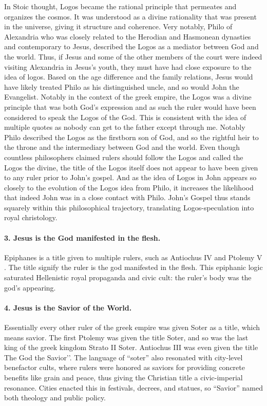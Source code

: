 In Stoic thought, Logos became the rational principle that permeates and organizes the cosmos.
It was understood as a divine rationality that was present in the universe, giving it structure and coherence.
Very notably, Philo of Alexandria who was closely related to the Herodian and Hasmonean dynasties and contemporary to Jesus, described the Logos as a mediator between God and the world.
Thus, if Jesus and some of the other members of the court were indeed visiting Alexandria in Jesus’s youth, they must have had close exposure to the idea of logos.
Based on the age difference and the family relations, Jesus would have likely treated Philo as his distinguished uncle, and so would John the Evangelist.
Notably in the context of the greek empire, the Logos was a divine principle that was both God’s expression and as such the ruler would have been considered to speak the Logos of the God.
This is consistent with the idea of multiple quotes as nobody can get to the father except through me.
Notably Philo described the Logos as the firstborn son of God, and so the rightful heir to the throne and the intermediary between God and the world.
Even though countless philosophers claimed rulers should follow the Logos and called the Logos the divine, the title of the Logos itself does not appear to have been given to any ruler prior to John’s gospel.
And as the idea of Logos in John appears so closely to the evolution of the Logos idea from Philo, it increases the likelihood that indeed John was in a close contact with Philo.
John’s Gospel thus stands squarely within this philosophical trajectory, translating Logos-speculation into royal christology.

\paragraph{3.
Jesus is the God manifested in the flesh.}\label{par:jesus-is-the-god-manifested-in-the-flesh.}
Epiphanes is a title given to multiple rulers, such as Antiochus IV and Ptolemy V .
The title signify the ruler is the god manifested in the flesh.
This epiphanic logic saturated Hellenistic royal propaganda and civic cult: the ruler’s body was the god’s appearing.

\paragraph{4.
Jesus is the Savior of the World.}\label{par:jesus-is-the-savior-of-the-world.}
Essentially every other ruler of the greek empire was given Soter as a title, which means savior.
The first Ptolemy was given the title Soter, and so was the last king of the greek kingdom Strato II Soter.
Antiochus III was even given the title The God the Savior’’.
The language of “soter” also resonated with city-level benefactor cults, where rulers were honored as saviors for providing concrete benefits like grain and peace, thus giving the Christian title a civic-imperial resonance.
Cities enacted this in festivals, decrees, and statues, so “Savior” named both theology and public policy.
